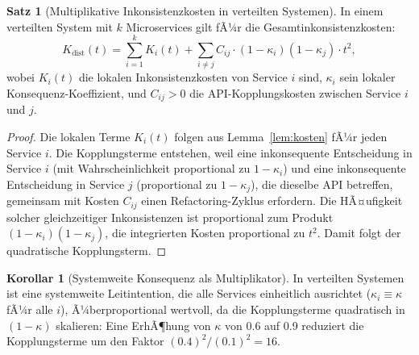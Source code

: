 ﻿\documentclass[a4paper,12pt]{article}
\theoremstyle{definition}
\newtheorem{satz}{Satz}
\newtheorem{korollar}{Korollar}
\begin{document}
\begin{satz}[Multiplikative Inkonsistenzkosten in verteilten Systemen]
\label{satz:distributed}
In einem verteilten System mit $k$ Microservices gilt fÃ¼r die
Gesamtinkonsistenzkosten:
\[
K_{\text{dist}}(t) = \sum_{i=1}^k K_i(t) +
\sum_{i \neq j} C_{ij} \cdot (1 - \kappa_i)(1 - \kappa_j) \cdot t^2,
\]
wobei $K_i(t)$ die lokalen Inkonsistenzkosten von Service $i$ sind,
$\kappa_i$ sein lokaler Konsequenz-Koeffizient, und $C_{ij} > 0$
die API-Kopplungskosten zwischen Service $i$ und $j$.
\end{satz}

\begin{proof}
Die lokalen Terme $K_i(t)$ folgen aus Lemma~\ref{lem:kosten} fÃ¼r
jeden Service $i$. Die Kopplungsterme entstehen, weil eine inkonsequente
Entscheidung in Service $i$ (mit Wahrscheinlichkeit proportional zu
$1-\kappa_i$) und eine inkonsequente Entscheidung in Service $j$
(proportional zu $1-\kappa_j$), die dieselbe API betreffen, gemeinsam
mit Kosten $C_{ij}$ einen Refactoring-Zyklus erfordern. Die HÃ¤ufigkeit
solcher gleichzeitiger Inkonsistenzen ist proportional zum Produkt
$(1-\kappa_i)(1-\kappa_j)$, die integrierten Kosten proportional zu
$t^2$. Damit folgt der quadratische Kopplungsterm.
\end{proof}

\begin{korollar}[Systemweite Konsequenz als Multiplikator]
In verteilten Systemen ist eine systemweite Leitintention, die alle
Services einheitlich ausrichtet ($\kappa_i \equiv \kappa$ fÃ¼r alle $i$),
Ã¼berproportional wertvoll, da die Kopplungsterme quadratisch in $(1-\kappa)$
skalieren: Eine ErhÃ¶hung von $\kappa$ von 0.6 auf 0.9 reduziert die
Kopplungsterme um den Faktor $(0.4)^2/(0.1)^2 = 16$.
\end{korollar}
\end{document}
